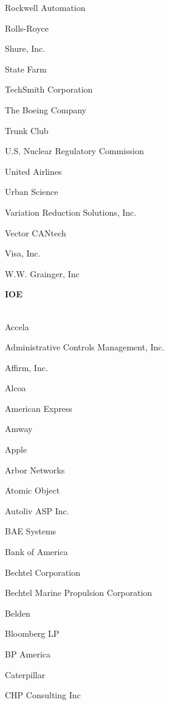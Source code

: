 \documentclass[twoside]{article}
\begin{document}
\begin{center}
\begin{multicols}{5}
\begin{FlushLeft}
\begin{compactitem}
\item Rockwell Automation
\item Rolls-Royce
\item Shure, Inc.
\item State Farm
\item TechSmith Corporation
\item The Boeing Company
\item Trunk Club
\item U.S. Nuclear Regulatory Commission
\item United Airlines
\item Urban Science
\item Variation Reduction Solutions, Inc.
\item Vector CANtech
\item Visa, Inc.
\item W.W. Grainger, Inc
\end{compactitem}
        \end{FlushLeft}
        \vspace{1em}
        {\fontsize{14}{16}\selectfont \bf IOE}\\
        \vspace{-1em}
        ~\hrulefill~
        \vspace{-.9em}
        \begin{FlushLeft}
        \begin{compactitem}
        \item Accela
\item Administrative Controls Management, Inc.
\item Affirm, Inc.
\item Alcoa
\item American Express
\item Amway
\item Apple
\item Arbor Networks
\item Atomic Object
\item Autoliv ASP Inc.
\item BAE Systems
\item Bank of America
\item Bechtel Corporation
\item Bechtel Marine Propulsion Corporation
\item Belden
\item Bloomberg LP
\item BP America
\item Caterpillar
\item CHP Consulting Inc

\end{compactitem}
\end{FlushLeft}
\end{multicols}
\end{center}
\end{document}

